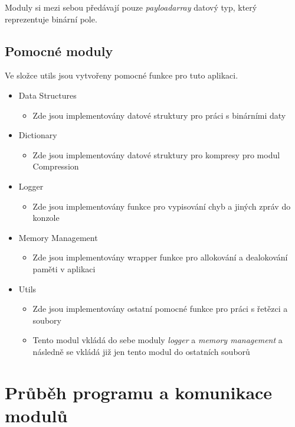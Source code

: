\documentclass[12pt]{report}
\begin{document}
    Moduly si mezi sebou předávají pouze \textit{payloadarray} datový typ, který reprezentuje binární pole.
   
\subsection{Pomocné moduly}
    Ve složce utils jsou vytvořeny pomocné funkce pro tuto aplikaci.
    \begin{itemize}
        \item Data Structures
        \begin{itemize}
            \item Zde jsou implementovány datové struktury pro práci s binárními daty
        \end{itemize}
        \item Dictionary
        \begin{itemize}
            \item Zde jsou implementovány datové struktury pro kompresy pro modul Compression
        \end{itemize}
        \item Logger
        \begin{itemize}
            \item Zde jsou implementovány funkce pro vypisování chyb a jiných zpráv do konzole
        \end{itemize}
        \item Memory Management
        \begin{itemize}
            \item Zde jsou implementovány wrapper funkce pro allokování a dealokování paměti v aplikaci
        \end{itemize}
        \item Utils
        \begin{itemize}
            \item Zde jsou implementovány ostatní pomocné funkce pro práci s řetězci a soubory
        \end{itemize}
        \begin{itemize}
            \item Tento modul vkládá do sebe moduly \textit{logger} a \textit{memory management} a následně se vkládá již jen tento modul do ostatních souborů
        \end{itemize}
    \end{itemize}


 
    
\section{Průběh programu a komunikace modulů}
    
\end{document}
